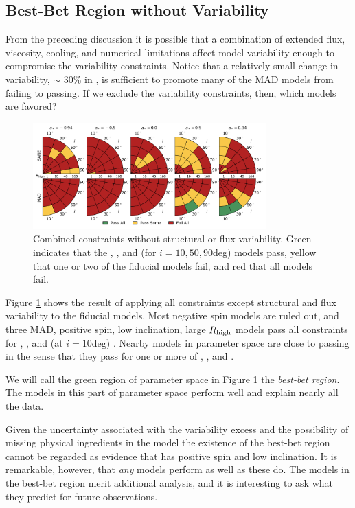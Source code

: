 \subsection{Best-Bet Region without Variability}

From the preceding discussion it is possible that a  combination of extended flux, viscosity, cooling, and numerical limitations affect model variability enough to compromise the variability constraints.
Notice that a relatively small change in variability, $\sim$ 30\% in , is sufficient to promote many of the MAD models from failing to passing.
If we exclude the variability constraints, then, which models are favored?

\begin{figure}
  \centering
  \includegraphics[width=0.8\textwidth]{./figures/All_Constraints.png}
  \caption{Combined constraints without structural or flux variability.
Green indicates that the \kharma, \bhac, and (for $i = 10, 50, 90$deg) \hamr models pass, yellow that one or two of the fiducial models fail, and red that all models fail.}
  \label{fig:all_pizza}
\end{figure}

Figure \ref{fig:all_pizza} shows the result of applying all constraints except structural and flux variability to the fiducial models.
Most negative spin models are ruled out, and three MAD, positive spin, low inclination, large $R_\mathrm{high}$ models pass all constraints for \kharma, \bhac, and (at $i = 10$deg) \hamr.
Nearby models in parameter space are close to passing in the sense that they pass for one or more of \kharma, \bhac, and \hamr.

We will call the green region of parameter space in Figure \ref{fig:all_pizza} the {\em best-bet region}.
The models in this part of parameter space perform well and explain nearly all the data.

Given the uncertainty associated with the variability excess and the possibility of missing physical ingredients in the model the existence of the best-bet region cannot be regarded as evidence that \sgra has positive spin and low inclination.
It is remarkable, however, that {\em any} models perform as well as these do.
The models in the best-bet region merit additional analysis, and it is interesting to ask what they predict for future observations.

